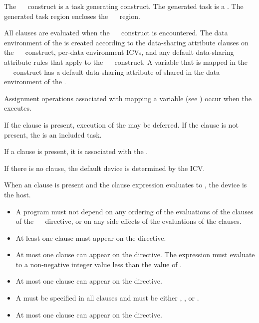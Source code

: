 The ~~ construct is a task generating construct.  The generated task is a .  The generated task region encloses the ~~ region.

All clauses are evaluated when the ~~ construct is encountered.  The data environment of the  is created according to the data-sharing attribute clauses on the ~~ construct, per-data environment ICVs, and any default data-sharing attribute rules that apply to the ~~ construct.  A variable that is mapped in the ~~ construct has a default data-sharing attribute of shared in the data environment of the .

Assignment operations associated with mapping a variable (see ) occur when the  executes.

If the  clause is present, execution of the  may be deferred.  If the  clause is not present, the  is an included task.

If a  clause is present, it is associated with the .

If there is no  clause, the default device is determined by the  ICV.

When an  clause is present and the  clause expression evaluates to , the device is the host.
{}

\restrictions
\begin{itemize}
\item A program must not depend on any ordering of the evaluations of the clauses of the ~~ directive, or on any side effects of the evaluations of the clauses.
\item At least one  clause must appear on the directive.
\item At most one  clause can appear on the
  directive.  The  expression must evaluate to a
  non-negative integer value less than the value of
  .
\item At most one  clause can appear on the directive.
\item A  must be specified in all  clauses and must be either , , or .
\item At most one  clause can appear on the directive.
\end{itemize}

